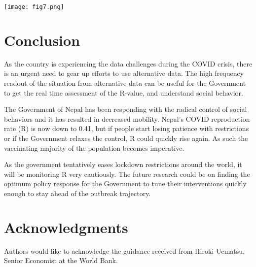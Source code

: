 \documentclass{article}
\begin{document}
\texttt{[image: fig7.png]}

\section{Conclusion}

As the country is experiencing the data challenges during the COVID crisis, there is an urgent need to gear up efforts to use alternative data. The high frequency readout of the situation from alternative data can be useful for the Government to get the real time assessment of the R-value, and understand social behavior. 

The Government of Nepal has been responding with the radical control of social behaviors and it has resulted in decreased mobility.  Nepal’s COVID reproduction rate (R) is now down to 0.41, but if people start losing patience with restrictions or if the Government relaxes the control, R could quickly rise again. As such the vaccinating majority of the population becomes imperative.

As the government tentatively eases lockdown restrictions around the world, it will be monitoring R very cautiously. The future research could be on finding the optimum policy response for the Government to tune their interventions quickly enough to stay ahead of the outbreak trajectory. 

\section*{Acknowledgments}
Authors would like to acknowledge the  guidance received from Hiroki Uematsu, Senior Economist at the World Bank.

  

\end{document}
